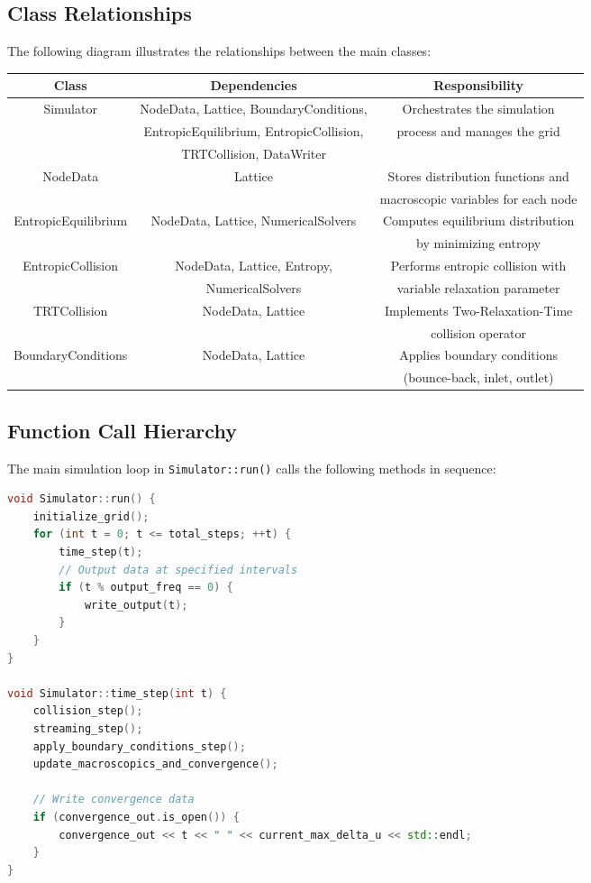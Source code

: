 \documentclass[12pt,a4paper]{article}
\begin{document}
\subsection{Class Relationships}
The following diagram illustrates the relationships between the main classes:

\begin{center}
\begin{tabular}{|c|c|c|}
\hline
\textbf{Class} & \textbf{Dependencies} & \textbf{Responsibility} \\
\hline
Simulator & NodeData, Lattice, BoundaryConditions, & Orchestrates the simulation \\
 & EntropicEquilibrium, EntropicCollision, & process and manages the grid \\
 & TRTCollision, DataWriter & \\
\hline
NodeData & Lattice & Stores distribution functions and \\
 & & macroscopic variables for each node \\
\hline
EntropicEquilibrium & NodeData, Lattice, NumericalSolvers & Computes equilibrium distribution \\
 & & by minimizing entropy \\
\hline
EntropicCollision & NodeData, Lattice, Entropy, & Performs entropic collision with \\
 & NumericalSolvers & variable relaxation parameter \\
\hline
TRTCollision & NodeData, Lattice & Implements Two-Relaxation-Time \\
 & & collision operator \\
\hline
BoundaryConditions & NodeData, Lattice & Applies boundary conditions \\
 & & (bounce-back, inlet, outlet) \\
\hline
\end{tabular}
\end{center}

\subsection{Function Call Hierarchy}
The main simulation loop in \texttt{Simulator::run()} calls the following methods in sequence:
\begin{lstlisting}[language=C++]
void Simulator::run() {
    initialize_grid();
    for (int t = 0; t <= total_steps; ++t) {
        time_step(t);
        // Output data at specified intervals
        if (t % output_freq == 0) {
            write_output(t);
        }
    }
}

void Simulator::time_step(int t) {
    collision_step();
    streaming_step();
    apply_boundary_conditions_step();
    update_macroscopics_and_convergence();

    // Write convergence data
    if (convergence_out.is_open()) {
        convergence_out << t << " " << current_max_delta_u << std::endl;
    }
}
\end{lstlisting}
\end{document}

